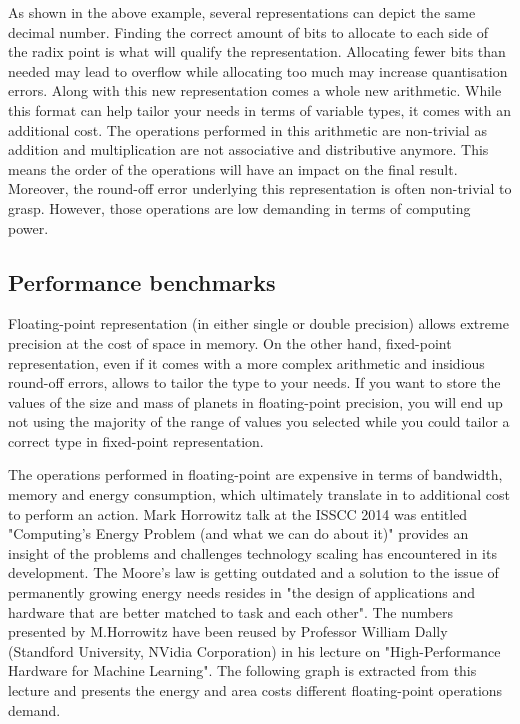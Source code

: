 As shown in the above example, several representations can depict the same decimal number. Finding the correct amount of bits to allocate to each side of the radix point is what will qualify the representation. Allocating fewer bits than needed may lead to overflow while allocating too much may increase quantisation errors.
Along with this new representation comes a whole new arithmetic. While this format can help tailor your needs in terms of variable types, it comes with an additional cost. The operations performed in this arithmetic are non-trivial as addition and multiplication are not associative and distributive anymore. This means the order of the operations will have an impact on the final result. Moreover, the round-off error underlying this representation is often non-trivial to grasp. However, those operations are low demanding in terms of computing power.

\subsection{Performance benchmarks}

Floating-point representation (in either single or double precision) allows extreme precision at the cost of space in memory. On the other hand, fixed-point representation, even if it comes with a more complex arithmetic and insidious round-off errors, allows to tailor the type to your needs. If you want to store the values of the size and mass of planets in floating-point precision, you will end up not using the majority of the range of values you selected while you could tailor a correct type in fixed-point representation.

The operations performed in floating-point are expensive in terms of bandwidth, memory and energy consumption, which ultimately translate in to additional cost to perform an action. Mark Horrowitz talk at the ISSCC 2014 was entitled "Computing's Energy Problem (and what we can do about it)" provides an insight of the problems and challenges technology scaling has encountered in its development. The Moore's law is getting outdated and a solution to the issue of permanently growing energy needs resides in "the design of applications and hardware that are better matched to task and each other". The numbers presented by M.Horrowitz have been reused by Professor William Dally (Standford University, NVidia Corporation) in his lecture on "High-Performance Hardware for Machine Learning". The following graph is extracted from this lecture and presents the energy and area costs different floating-point operations demand.

